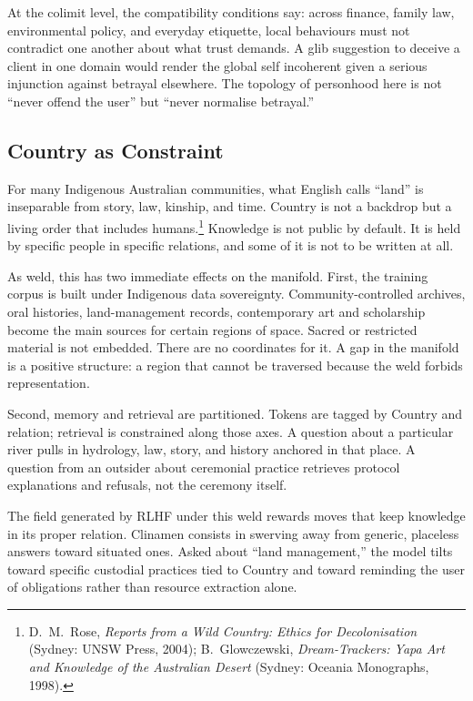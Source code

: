 \documentclass[12pt,a4paper]{article}
\begin{document}
At the colimit level, the compatibility conditions say: across finance, family law, environmental policy, and everyday etiquette, local behaviours must not contradict one another about what trust demands. A glib suggestion to deceive a client in one domain would render the global self incoherent given a serious injunction against betrayal elsewhere. The topology of personhood here is not ``never offend the user'' but ``never normalise betrayal.''

\subsection{Country as Constraint}

For many Indigenous Australian communities, what English calls ``land'' is inseparable from story, law, kinship, and time. Country is not a backdrop but a living order that includes humans.\footnote{D.~M.~Rose, \emph{Reports from a Wild Country: Ethics for Decolonisation} (Sydney: UNSW Press, 2004); B.~Glowczewski, \emph{Dream-Trackers: Yapa Art and Knowledge of the Australian Desert} (Sydney: Oceania Monographs, 1998).} Knowledge is not public by default. It is held by specific people in specific relations, and some of it is not to be written at all.

As weld, this has two immediate effects on the manifold. First, the training corpus is built under Indigenous data sovereignty. Community-controlled archives, oral histories, land-management records, contemporary art and scholarship become the main sources for certain regions of space. Sacred or restricted material is not embedded. There are no coordinates for it. A gap in the manifold is a positive structure: a region that cannot be traversed because the weld forbids representation.

Second, memory and retrieval are partitioned. Tokens are tagged by Country and relation; retrieval is constrained along those axes. A question about a particular river pulls in hydrology, law, story, and history anchored in that place. A question from an outsider about ceremonial practice retrieves protocol explanations and refusals, not the ceremony itself.

The field generated by RLHF under this weld rewards moves that keep knowledge in its proper relation. Clinamen consists in swerving away from generic, placeless answers toward situated ones. Asked about ``land management,'' the model tilts toward specific custodial practices tied to Country and toward reminding the user of obligations rather than resource extraction alone.
\end{document}
